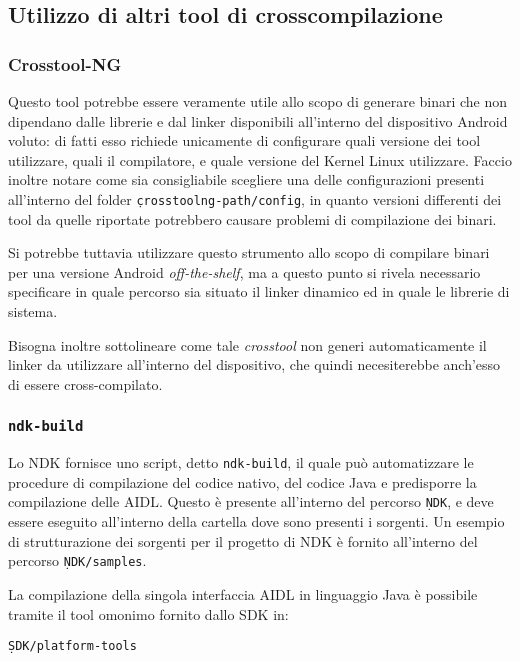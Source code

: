 \subsection{Utilizzo di altri tool di crosscompilazione}
\subsubsection{Crosstool-NG}

Questo tool potrebbe essere veramente utile allo scopo di generare binari che 
non dipendano dalle librerie e dal linker disponibili all'interno del dispositivo
Android voluto: di fatti esso richiede unicamente di configurare quali versione 
dei tool utilizzare, quali il compilatore, e quale versione del Kernel Linux
utilizzare.  Faccio inoltre notare come sia consigliabile scegliere una
delle configurazioni presenti all'interno del folder \texttt{\small \d crosstoolng-path/config},
in quanto versioni differenti dei tool da quelle riportate potrebbero causare
problemi di compilazione dei binari.

Si potrebbe tuttavia utilizzare questo strumento allo scopo di compilare binari
per una versione Android \textit{off-the-shelf}, ma a questo punto si rivela necessario
specificare in quale percorso sia situato il linker dinamico ed in quale le librerie
di sistema. 

Bisogna inoltre sottolineare come tale \textit{crosstool} non generi automaticamente 
il linker da utilizzare all'interno del dispositivo, che quindi necesiterebbe anch'esso
di essere cross-compilato.

\subsubsection{\texttt{ndk-build}}\label{subsub:ndkbuild}
Lo NDK fornisce uno script, detto \texttt{\small ndk-build}, il quale può automatizzare
le procedure di compilazione del codice nativo, del codice Java e predisporre
la compilazione delle AIDL. Questo è presente all'interno del percorso \texttt{\small \d NDK},
e deve essere eseguito all'interno della cartella dove sono presenti i sorgenti.
Un esempio di strutturazione dei sorgenti per il progetto di NDK è fornito
all'interno del percorso \texttt{\small \d NDK/samples}.

La compilazione della singola interfaccia AIDL in linguaggio Java è possibile 
tramite il tool omonimo fornito dallo SDK in:
\begin{center}
\texttt{\small \d SDK/platform-tools}
\end{center}
